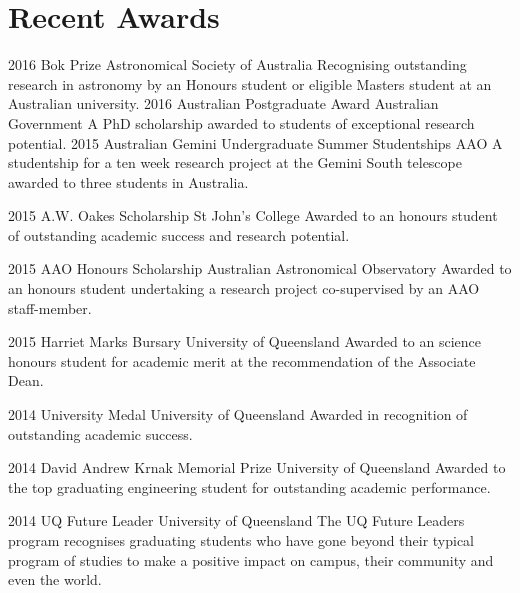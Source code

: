 \documentclass[]{friggeri-cv} %
\begin{document}
\section{Recent Awards}
\begin{entrylist}
\entry
{2016}
{Bok Prize}
{Astronomical Society of Australia}
{Recognising outstanding research in astronomy by an Honours student or eligible Masters student at an Australian university.}
\entry
{2016}
{Australian Postgraduate Award}
{Australian Government}
{A PhD scholarship awarded to students of exceptional research potential.}
\entry
{2015}
{Australian Gemini Undergraduate Summer Studentships}
{AAO}
{A studentship for a ten week research project at the Gemini South telescope awarded to three students in Australia.}
\end{entrylist}
\begin{entrylist}
\entry
{2015}
{A.W. Oakes Scholarship}
{St John's College}
{Awarded to an honours student of outstanding academic success and research potential.}
\end{entrylist}
\begin{entrylist}
\entry
{2015}
{AAO Honours Scholarship}
{Australian Astronomical Observatory}
{Awarded to an honours student undertaking a research project co-supervised by an AAO staff-member.}
\end{entrylist}
\begin{entrylist}
\entry
{2015}
{Harriet Marks Bursary}
{University of Queensland}
{Awarded to an science honours student for academic merit at the recommendation of the Associate Dean.}
\end{entrylist}
\begin{entrylist}
\entry
{2014}
{University Medal}
{University of Queensland}
{Awarded in recognition of outstanding academic success.}
\end{entrylist}
\begin{entrylist}
\entry
{2014}
{David Andrew Krnak Memorial Prize}
{University of Queensland}
{Awarded to the top graduating engineering student for outstanding academic performance.}
\end{entrylist}
\begin{entrylist}
\entry
{2014}
{UQ Future Leader}
{University of Queensland}
{The UQ Future Leaders program recognises graduating students who have gone beyond their typical program of studies to make a positive impact on campus, their community and even the world.}
\end{entrylist}
\end{document}
